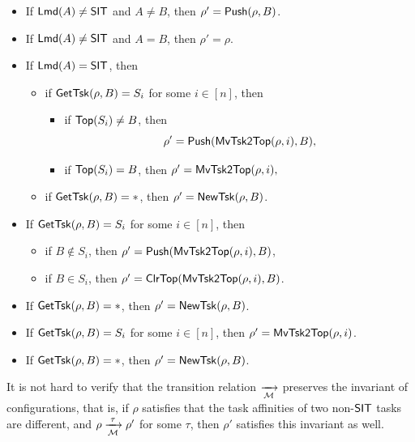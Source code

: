 \noindent {}
	\begin{itemize}
		\item  If ${\sf Lmd}(A) \neq \mathsf{SIT}$ and $A \neq B$, then $\rho' = \mathsf{Push}(\rho,B)$.
		\item  If ${\sf Lmd}(A) \neq \mathsf{SIT}$ and $A = B$, then $\rho' =  \rho$.
		\item If ${\sf Lmd}(A) = \mathsf{SIT}$, then
    		\begin{itemize}
    			\item if $\mathsf{GetTsk}(\rho, B)=S_i$ for some $i\in[n]$,  then
                \begin{itemize}
                    \item if $\mathsf{Top}(S_i)\neq B$, then 
                    $$\rho'=\mathsf{Push}(\mathsf{MvTsk2Top}(\rho, i),B),$$
                    \item if $\mathsf{Top}(S_i)= B$, then $\rho'=\mathsf{MvTsk2Top}(\rho, i),$
                \end{itemize}
    			\item if $\mathsf{GetTsk}(\rho, B)=*$, then $\rho'= \mathsf{NewTsk}(\rho,B )$.
    		\end{itemize}
	 \end{itemize}
	
\noindent {}
\begin{itemize}
	\item If $\mathsf{GetTsk}(\rho, B) = S_i$ for some $i\in[n]$, then
	\begin{itemize}
        \item if $B \not \in S_i$, then $\rho' = \mathsf{Push}(\mathsf{MvTsk2Top}(\rho, i), B)$,
        \item if $B  \in S_i$, 	then $\rho' =  \mathsf{ClrTop}(\mathsf{MvTsk2Top}(\rho, i), B)$.
	\end{itemize}
\item If $\mathsf{GetTsk}(\rho, B) = *$, then $\rho' = \mathsf{NewTsk}(\rho, B)$.
\end{itemize}

\noindent {}
\begin{itemize}
	\item If $\mathsf{GetTsk}(\rho, B) = S_i$ for some $i \in [n]$, then $\rho' = \mathsf{MvTsk2Top}(\rho, i)$.
	\item If $\mathsf{GetTsk}(\rho, B) = *$, then $\rho' = \mathsf{NewTsk}(\rho, B)$.
\end{itemize}
It is not hard to verify that the transition relation $\xrightarrow[{\mathcal{M} }]{}$ preserves the invariant of configurations, that is, if $\rho$ satisfies that the task affinities of two non-${\sf SIT}$ tasks are different, and $\rho \xrightarrow[{\mathcal{M} }]{\tau} \rho'$ for some $\tau$, then $\rho'$ satisfies this invariant as well. 

